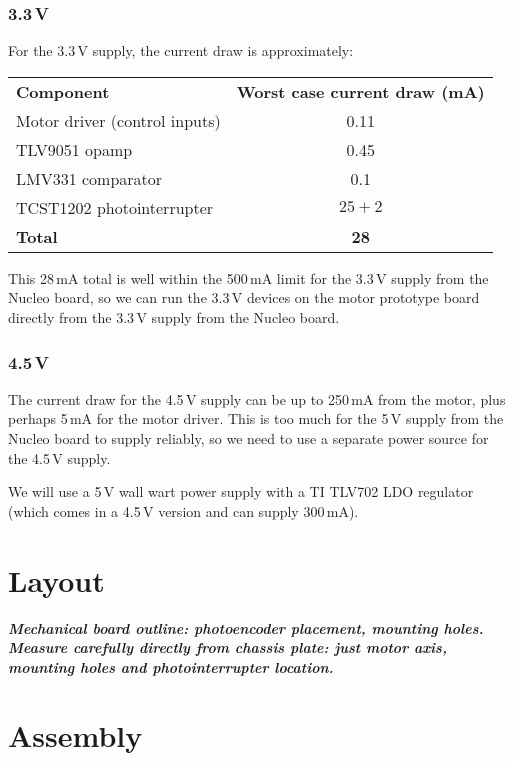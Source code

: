 \documentclass[a4paper,11pt,article]{memoir}
\newcommand{\todo}[1]{{\color{red}\textit{\textbf{#1}}}}
\begin{document}
\subsubsection{3.3\,V}

For the 3.3\,V supply, the current draw is approximately:

\begin{center}
  \begin{tabular}{lc}
    \textbf{Component} & \textbf{Worst case current draw (mA)} \\
    Motor driver (control inputs) & 0.11 \\
    TLV9051 opamp & 0.45 \\
    LMV331 comparator & 0.1 \\
    TCST1202 photointerrupter & $25 + 2$ \\
    \textbf{Total} & \textbf{28} \\
  \end{tabular}
\end{center}

This 28\,mA total is well within the 500\,mA limit for the 3.3\,V
supply from the Nucleo board, so we can run the 3.3\,V devices on the
motor prototype board directly from the 3.3\,V supply from the Nucleo board.

\subsubsection{4.5\,V}

The current draw for the 4.5\,V supply can be up to 250\,mA from the
motor, plus perhaps 5\,mA for the motor driver. This is too much for
the 5\,V supply from the Nucleo board to supply reliably, so we need
to use a separate power source for the 4.5\,V supply.

We will use a 5\,V wall wart power supply with a TI TLV702 LDO
regulator (which comes in a 4.5\,V version and can supply 300\,mA).


\section*{Layout}

\todo{Mechanical board outline: photoencoder placement, mounting
  holes. Measure carefully directly from chassis plate: just motor
  axis, mounting holes and photointerrupter location.}


\section*{Assembly}
\end{document}
